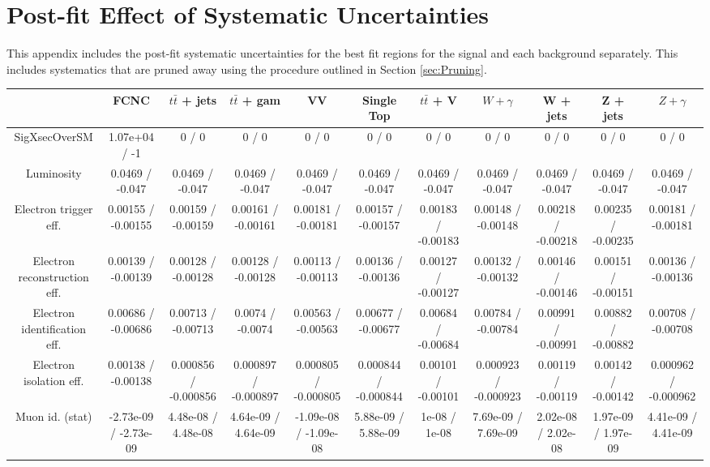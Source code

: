 \chapter{Post-fit Effect of Systematic Uncertainties  }
\label{app:Syst_Eff}
%
This appendix includes the post-fit systematic uncertainties for the best fit regions for the signal and each background separately.  This includes systematics that are pruned away using the procedure outlined in Section \ref{sec:Pruning}.
%
{\fontsize{2.4}{4}\selectfont
\begin{landscape}
\setlength\LTleft{-130pt}            %
\setlength\LTright{-30pt}           %


\begin{longtable}{@{\extracolsep{\fill}}| *{11}{c|}}
\hline 
      & FCNC      & $t\bar{t}$ + jets      & $t\bar{t}$ +  gam      & VV      & Single Top      & $t\bar{t}$ + V      & $W+\gamma$      & W + jets      & Z + jets      & $Z+\gamma$ \\ 
\hline 
 SigXsecOverSM & 1.07e+04 / -1 & 0 / 0 & 0 / 0 & 0 / 0 & 0 / 0 & 0 / 0 & 0 / 0 & 0 / 0 & 0 / 0 & 0 / 0 \\ 
  Luminosity & 0.0469 / -0.047 & 0.0469 / -0.047 & 0.0469 / -0.047 & 0.0469 / -0.047 & 0.0469 / -0.047 & 0.0469 / -0.047 & 0.0469 / -0.047 & 0.0469 / -0.047 & 0.0469 / -0.047 & 0.0469 / -0.047 \\ 
  Electron trigger eff. & 0.00155 / -0.00155 & 0.00159 / -0.00159 & 0.00161 / -0.00161 & 0.00181 / -0.00181 & 0.00157 / -0.00157 & 0.00183 / -0.00183 & 0.00148 / -0.00148 & 0.00218 / -0.00218 & 0.00235 / -0.00235 & 0.00181 / -0.00181 \\ 
  Electron reconstruction eff. & 0.00139 / -0.00139 & 0.00128 / -0.00128 & 0.00128 / -0.00128 & 0.00113 / -0.00113 & 0.00136 / -0.00136 & 0.00127 / -0.00127 & 0.00132 / -0.00132 & 0.00146 / -0.00146 & 0.00151 / -0.00151 & 0.00136 / -0.00136 \\ 
  Electron identification eff. & 0.00686 / -0.00686 & 0.00713 / -0.00713 & 0.0074 / -0.0074 & 0.00563 / -0.00563 & 0.00677 / -0.00677 & 0.00684 / -0.00684 & 0.00784 / -0.00784 & 0.00991 / -0.00991 & 0.00882 / -0.00882 & 0.00708 / -0.00708 \\ 
  Electron isolation eff. & 0.00138 / -0.00138 & 0.000856 / -0.000856 & 0.000897 / -0.000897 & 0.000805 / -0.000805 & 0.000844 / -0.000844 & 0.00101 / -0.00101 & 0.000923 / -0.000923 & 0.00119 / -0.00119 & 0.00142 / -0.00142 & 0.000962 / -0.000962 \\ 
  Muon id. (stat) & -2.73e-09 / -2.73e-09 & 4.48e-08 / 4.48e-08 & 4.64e-09 / 4.64e-09 & -1.09e-08 / -1.09e-08 & 5.88e-09 / 5.88e-09 & 1e-08 / 1e-08 & 7.69e-09 / 7.69e-09 & 2.02e-08 / 2.02e-08 & 1.97e-09 / 1.97e-09 & 4.41e-09 / 4.41e-09 \\ 

\end{longtable}
\end{landscape}}
